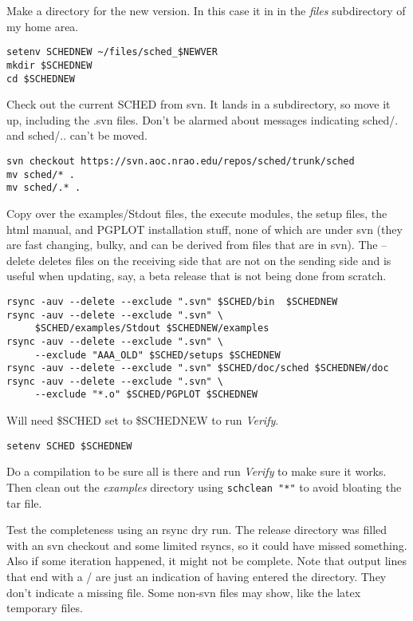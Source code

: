 \documentclass{report}
\begin{document}
\begin{description}
Make a directory for the new version.  In this case it in in the 
{\sl files} subdirectory of my home area.

\begin{verbatim}
setenv SCHEDNEW ~/files/sched_$NEWVER
mkdir $SCHEDNEW
cd $SCHEDNEW
\end{verbatim}

Check out the current SCHED from svn.  It lands in a subdirectory, so
move it up, including the .svn files.  Don't be alarmed about messages
indicating sched/. and sched/.. can't be moved.

\begin{verbatim}
svn checkout https://svn.aoc.nrao.edu/repos/sched/trunk/sched
mv sched/* .
mv sched/.* .
\end{verbatim}

Copy over the examples/Stdout files, the execute modules, the setup
files, the html manual, and PGPLOT installation stuff, none of which
are under svn (they are fast changing, bulky, and can be derived from
files that are in svn).  The --delete deletes files on the receiving
side that are not on the sending side and is useful when updating,
say, a beta release that is not being done from scratch.

\begin{verbatim}
rsync -auv --delete --exclude ".svn" $SCHED/bin  $SCHEDNEW
rsync -auv --delete --exclude ".svn" \
     $SCHED/examples/Stdout $SCHEDNEW/examples
rsync -auv --delete --exclude ".svn" \
     --exclude "AAA_OLD" $SCHED/setups $SCHEDNEW
rsync -auv --delete --exclude ".svn" $SCHED/doc/sched $SCHEDNEW/doc
rsync -auv --delete --exclude ".svn" \
     --exclude "*.o" $SCHED/PGPLOT $SCHEDNEW
\end{verbatim}

Will need \$SCHED set to \$SCHEDNEW to run {\sl Verify}.
\begin{verbatim}
setenv SCHED $SCHEDNEW
\end{verbatim}
Do a compilation to be sure all is there and run {\sl Verify} to make
sure it works.  Then clean out the {\sl examples} directory using
{\tt schclean "*"} to avoid bloating the tar file.

Test the completeness using an rsync dry run.  The release directory
was filled with an svn checkout and some limited rsyncs, so it could
have missed something.  Also if some iteration happened, it might not
be complete. Note that output lines that end with a / are just an
indication of having entered the directory.  They don't indicate a
missing file.  Some non-svn files may show, like the latex temporary 
files.


\end{description}
\end{document}

